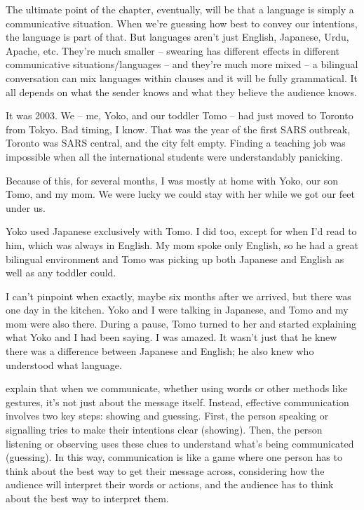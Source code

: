 The ultimate point of the chapter, eventually, will be that a language is simply a communicative situation. When we're guessing how best to convey our intentions, the language is part of that. But languages aren't just English, Japanese, Urdu, Apache, etc. They're much smaller -- swearing has different effects in different communicative situations/languages -- and they're much more mixed -- a bilingual conversation can mix languages within clauses and it will be fully grammatical. It all depends on what the sender knows and what they believe the audience knows.

It was 2003. We -- me, Yoko, and our toddler Tomo -- had just moved to Toronto from Tokyo. Bad timing, I know. That was the year of the first SARS outbreak, Toronto was SARS central, and  the city felt empty. Finding a teaching job was impossible when all the international students were understandably panicking.

Because of this, for several months, I was mostly at home with Yoko, our son Tomo, and my mom. We were lucky we could stay with her while we got our feet under us.

Yoko used Japanese exclusively with Tomo. I did too, except for when I'd read to him, which was always in English. My mom spoke only English, so he had a great bilingual environment and Tomo was picking up both Japanese and English as well as any toddler could.

I can't pinpoint when exactly, maybe six months after we arrived, but there was one day in the kitchen. Yoko and I were talking in Japanese, and Tomo and my mom were also there. During a pause, Tomo turned to her and started explaining what Yoko and I had been saying. I was amazed. It wasn't just that he knew there was a difference between Japanese and English; he also knew who understood what language.

\citet{Smith2019a} explain that when we communicate, whether using words or other methods like gestures, it's not just about the message itself. Instead, effective communication involves two key steps: showing and guessing. First, the person speaking or signalling tries to make their intentions clear (showing). Then, the person listening or observing uses these clues to understand what's being communicated (guessing). In this way, communication is like a game where one person has to think about the best way to get their message across, considering how the audience will interpret their words or actions, and the audience has to think about the best way to interpret them.

